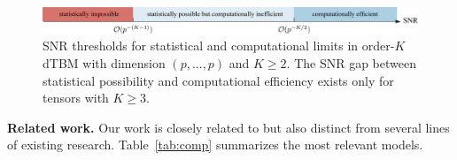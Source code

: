 \documentclass[lettersize,onecolumn,journal]{IEEEtran}
\theoremstyle{definition}
\theoremstyle{definition}
\begin{document}
\begin{figure}[t]
    \centering
    \includegraphics[width = 17cm]{phase.pdf}
    \caption{SNR thresholds for statistical and computational limits in order-$K$ dTBM with dimension $(p,...,p)$ and $K \geq 2$. The SNR gap between statistical possibility and computational efficiency  exists only for tensors with $K \geq 3$. }
    \label{fig:phase_axis}
\end{figure}




{\bf Related work.} 
Our work is closely related to but also distinct from several lines of existing research. Table~\ref{tab:comp} summarizes the most relevant models. 
\end{document}
